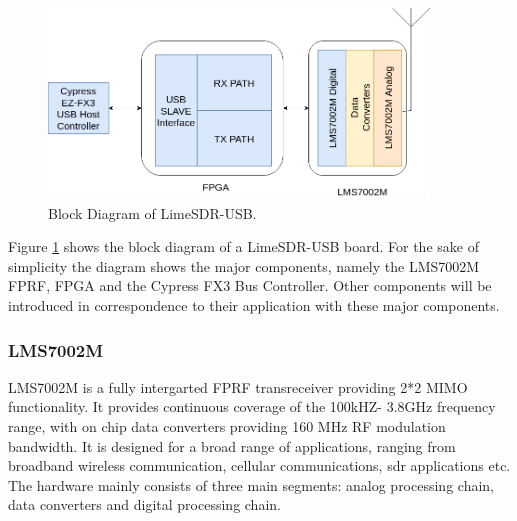 \begin{figure}[h!]
\centering
\includegraphics[width=0.9\textwidth]{Figure/Lime_Hardware.png}
\caption{Block Diagram of LimeSDR-USB.}
\label{lime_hw_arch}
\end{figure}

Figure \ref{lime_hw_arch} shows the block diagram of a LimeSDR-USB board.
For the sake of simplicity the diagram shows the major components, namely the LMS7002M \ac{FPRF}, \ac{FPGA} and the Cypress FX3 Bus Controller.
Other components will be introduced in correspondence to their application with these major components.

\subsubsection{LMS7002M} 

LMS7002M is a fully intergarted \ac{FPRF} transreceiver providing 2*2 \ac{MIMO} functionality.
It provides continuous coverage of the 100kHZ- 3.8GHz frequency range, with on chip data converters providing 160 MHz \ac{RF} modulation bandwidth.
It is designed for a broad range of applications, ranging from broadband wireless communication, cellular communications, \ac{sdr} applications etc.\\
The hardware mainly consists of three main segments: analog processing chain, data converters and digital processing chain.\\

